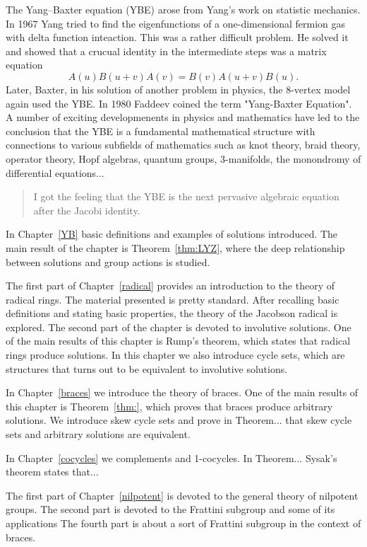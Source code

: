 
The Yang--Baxter equation (YBE) arose from Yang's work on statistic mechanics. In 1967 Yang tried to find the eigenfunctions of a one-dimensional fermion gas with delta function inteaction. This was
a rather difficult problem. He solved it and showed that a crucual identity in the intermediate steps was a matrix equation
\[
A(u)B(u+v)A(v)=B(v)A(u+v)B(u).
\]
Later, Baxter, in his solution of another problem in physics, the 8-vertex model again used the YBE. 
In 1980 Faddeev coined the term "Yang-Baxter Equation". A number of exciting developmenents in 
physics and mathematics have led to the conclusion that the YBE is a fundamental mathematical structure with connections to various subfields of mathematics such as 
knot theory, braid theory, operator theory, Hopf algebras, quantum groups, 3-manifolds, the monondromy of differential equations...

\begin{quote}
    I got the feeling that the YBE is the next pervasive algebraic equation after the Jacobi identity.
\end{quote}


\medskip
In Chapter~\ref{YB} basic definitions and examples of solutions introduced. 
The main result of the chapter is Theorem~\ref{thm:LYZ}, 
where the deep relationship between
solutions and group actions is studied. 

The first part of Chapter~\ref{radical} provides an introduction to the theory of radical rings.
The material presented is pretty standard. 
After recalling basic definitions and stating basic properties, the theory of the Jacobson
radical is explored. The second part of the chapter is devoted to involutive solutions. One of the
main results of this chapter is Rump's theorem, which states that radical rings produce solutions. 
In this
chapter we also introduce cycle sets, which are structures that turns out to be equivalent
to involutive solutions. 

In Chapter~\ref{braces} we introduce the theory of braces. One of the main results of this 
chapter is Theorem~\ref{thm:}, which proves that braces produce arbitrary solutions. We introduce
skew cycle sets and prove in Theorem... that skew cycle sets and arbitrary solutions are equivalent. 

In Chapter~\ref{cocycles} we complements and 1-cocycles. 
In Theorem... 
Sysak's theorem states that...

The first part of Chapter~\ref{nilpotent} is devoted to the general theory of nilpotent groups. 
The second part is devoted to the Frattini subgroup and some of its applications
The fourth part is about a sort of Frattini subgroup in the context of braces. 


